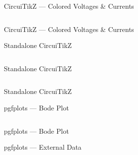 \begin{frame}[fragile]{CircuiTikZ --- Colored Voltages \& Currents}
    \begin{listing}
        \inputminted[fontsize=\footnotesize]{latex}{assets/tex/figures/circuitikz-colored.tex}
        \caption{Automatic \textcolor{vcolor}{voltage} and \textcolor{icolor}{current} coloring}
    \end{listing}
\end{frame}

\begin{frame}{CircuiTikZ --- Colored Voltages \& Currents}
    
\end{frame}

\begin{frame}[fragile]{Standalone CircuiTikZ}
    \begin{listing}
        \inputminted[fontsize=\tiny]{latex}{assets/circuits/rc-filter.tex}
        \caption{Standalone circuit source from \texttt{assets/circuits/}}
    \end{listing}
\end{frame}

\begin{frame}[fragile]{Standalone CircuiTikZ}
    \begin{listing}
        \inputminted[fontsize=\tiny]{latex}{assets/tex/figures/circuitikz-standalone.tex}
        \caption{Including the compiled standalone circuit}
    \end{listing}
\end{frame}

\begin{frame}{Standalone CircuiTikZ}
    
\end{frame}

\begin{frame}[fragile]{pgfplots --- Bode Plot}
    \begin{listing}
        \inputminted[fontsize=\tiny]{latex}{assets/tex/figures/pgfplots-bode.tex}
        \caption{RC low-pass transfer function with asymptotes (excerpt)}
    \end{listing}
\end{frame}

\begin{frame}{pgfplots --- Bode Plot}
    
\end{frame}

\begin{frame}[fragile]{pgfplots --- External Data}
    \begin{listing}
        \inputminted[fontsize=\tiny, lastline=20]{latex}{assets/tex/figures/pgfplots-data.tex}
        \caption{Plotting from an external \acs{csv} file (excerpt)}
    \end{listing}
\end{frame}

